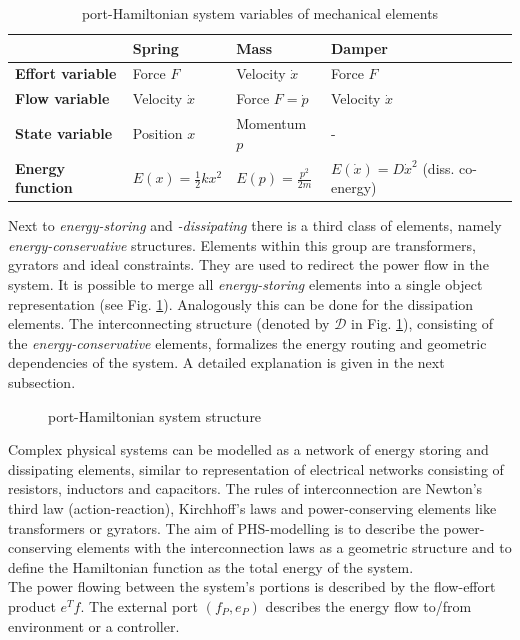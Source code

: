 \documentclass[a4paper,twoside, openright,12pt]{report}
\begin{document}
\begin{table}
	\centering
	\caption[port-Hamiltonian system variables of mechanical elements]{port-Hamiltonian system variables of mechanical elements}\vspace{10pt}
	\label{TAB:PHSvar_mechanic}
	
	\begin{tabular}{ l | l | l | l }
		& \textbf{Spring} & \textbf{Mass} & \textbf{Damper} \\ \hline
		\textbf{Effort variable} & Force $F$ & Velocity $\dot{x}$ & Force $ F $ \\ \hline
		\textbf{Flow variable} & Velocity $ \dot{x} $ & Force $ F = \dot{p} $ & Velocity $ \dot{x} $ \\ \hline
		\textbf{State variable} & Position $x$ & Momentum $ p $ & - \\ \hline
		\textbf{Energy function} & $ E(x) = \frac{1}{2}kx^2 $ & $ E(p) = \frac{p^2}{2m} $ & $E(\dot{x}) = D\dot{x}^2  $ (diss. co-energy) \\ 
	\end{tabular}
\end{table}

Next to \emph{energy-storing} and \emph{-dissipating} there is a third class of elements, namely \emph{energy-conservative} structures. Elements within this group are transformers, gyrators and ideal constraints. They are used to redirect the power flow in the system. It is possible to merge all \emph{energy-storing} elements into a single object representation (see Fig. \ref{FIG:pHsstructure}). Analogously this can be done for the dissipation elements. The interconnecting structure (denoted by $\mathcal{D}$ in Fig. \ref{FIG:pHsstructure}), consisting of the \emph{energy-conservative} elements, formalizes the energy routing and geometric dependencies of the system. A detailed explanation is given in the next subsection.


\begin{figure}[b!]
	\centering
	\sf\small
	\def\svgwidth{0.6\columnwidth}
	
	\caption{port-Hamiltonian system structure}
	\label{FIG:pHsstructure}
\end{figure}

Complex physical systems can be modelled as a network of energy storing and dissipating elements, similar to representation of electrical networks consisting of resistors, inductors and capacitors. The rules of interconnection are Newton's third law (action-reaction), Kirchhoff's laws and power-conserving elements like transformers or gyrators. The aim of PHS-modelling is to describe the power-conserving elements with the interconnection laws as a geometric structure and to define the Hamiltonian function as the total energy of the system. \\
The power flowing between the system's portions is described by the flow-effort product $e^Tf$. The external port $(f_P,e_P)$ describes the energy flow to/from environment or a controller. 
\end{document}
